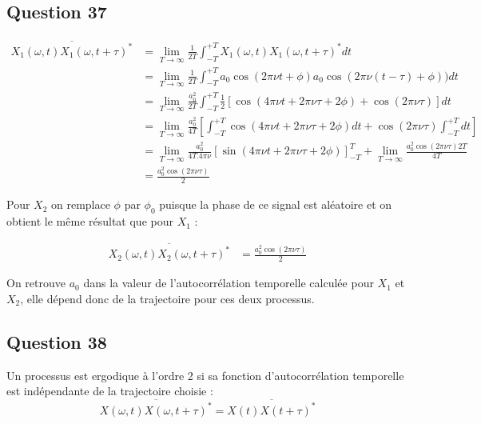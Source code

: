 \documentclass{article}
\begin{document}
\subsection*{Question 37}

\begin{equation}
\begin{aligned}
\overline{X_1(\omega,t)X_1(\omega,t+\tau)^*}
& = \lim_{T\rightarrow\infty} \frac{1}{2T}\int_{-T}^{+T}X_1(\omega,t)X_1(\omega,t+\tau)^*dt \\
& = \lim_{T\rightarrow\infty} \frac{1}{2T}\int_{-T}^{+T} a_0\cos(2\pi\nu t +\phi)a_0\cos(2\pi\nu(t-\tau) +\phi)) dt \\
& = \lim_{T\rightarrow\infty} \frac{a_0^2}{2T}\int_{-T}^{+T} \frac{1}{2}[\cos(4\pi\nu t + 2\pi\nu\tau + 2\phi) + \cos(2\pi\nu\tau)] dt \\
& = \lim_{T\rightarrow\infty} \frac{a_0^2}{4T} [\int_{-T}^{+T} \cos(4\pi\nu t + 2\pi\nu\tau + 2\phi) dt + \cos(2\pi\nu\tau) \int_{-T}^{+T} dt] \\
& = \lim_{T\rightarrow\infty} \frac{a_0^2}{4T.4\pi\nu}[\sin(4\pi\nu t + 2\pi\nu\tau + 2\phi)]_{-T}^T + \lim_{T\rightarrow\infty} \frac{a_0^2\cos(2\pi\nu\tau)2T}{4T} \\
& = \frac{a_0^2\cos(2\pi\nu\tau)}{2}
\end{aligned}
\end{equation}

Pour $X_2$ on remplace $\phi$ par $\phi_0$ puisque la phase de ce signal est aléatoire et on obtient le même résultat que pour $X_1$ :

\begin{equation}
\begin{aligned}
\overline{X_2(\omega,t)X_2(\omega,t+\tau)^*}
& = \frac{a_0^2\cos(2\pi\nu\tau)}{2}
\end{aligned}
\end{equation}

On retrouve $a_0$ dans la valeur de l'autocorrélation temporelle calculée pour $X_1$ et $X_2$, elle dépend donc de la trajectoire pour ces deux processus.

\subsection*{Question 38}
Un processus est ergodique à l'ordre 2 si sa fonction d'autocorrélation temporelle est indépendante de la trajectoire choisie :
\begin{equation*}
\overline{X(\omega,t)X(\omega,t+\tau)^*} = \overline{X(t)X(t+\tau)^*}
\end{equation*}
\end{document}

